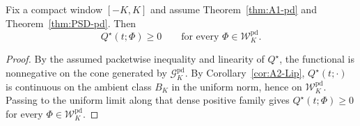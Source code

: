 \begin{proposition}\label{prop:compatibility-reduction-shifted-atoms}
Fix a compact window $[-K,K]$ and assume Theorem~\ref{thm:A1-pd} and
Theorem~\ref{thm:PSD-pd}.
Then
\[
  Q^\star(t;\Phi)\ge 0 \qquad \text{for every }\Phi\in \mathcal W_K^{\mathrm{pd}}.
\]
\end{proposition}

\begin{proof}
By the assumed packetwise inequality and linearity of $Q^\star$, the functional is
nonnegative on the cone generated by $\mathcal G_K^{\mathrm{pd}}$.
By Corollary~\ref{cor:A2-Lip}, $Q^\star(t;\cdot)$ is continuous on the ambient class $B_K$ in the uniform norm, hence on $\mathcal W_K^{\mathrm{pd}}$.
Passing to the uniform limit along that dense positive family gives
$Q^\star(t;\Phi)\ge 0$ for every $\Phi\in\mathcal W_K^{\mathrm{pd}}$.
\end{proof}

